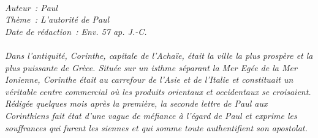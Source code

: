 \BFont
\noindent\hrulefill
{\footnotesize
\textit{
\bigskip
{\centering{}
\\Auteur~: Paul
\\Thème~: L'autorité de Paul
\\Date de rédaction~: Env. 57 ap. J.-C.\\}
}
\textit{
\\Dans l'antiquité, Corinthe, capitale de l'Achaïe, était la ville la plus prospère et la plus puissante de Grèce. Située sur un isthme séparant la Mer Egée de la Mer Ionienne, Corinthe était au carrefour de l'Asie et de l'Italie et constituait un véritable centre commercial où les produits orientaux et occidentaux se croisaient.
\\Rédigée quelques mois après la première, la seconde lettre de Paul aux Corinthiens fait état d'une vague de méfiance à l'égard de Paul et exprime les souffrances qui furent les siennes et qui somme toute authentifient son apostolat.\bigskip
}
}
\par\nobreak\noindent\hrulefill
